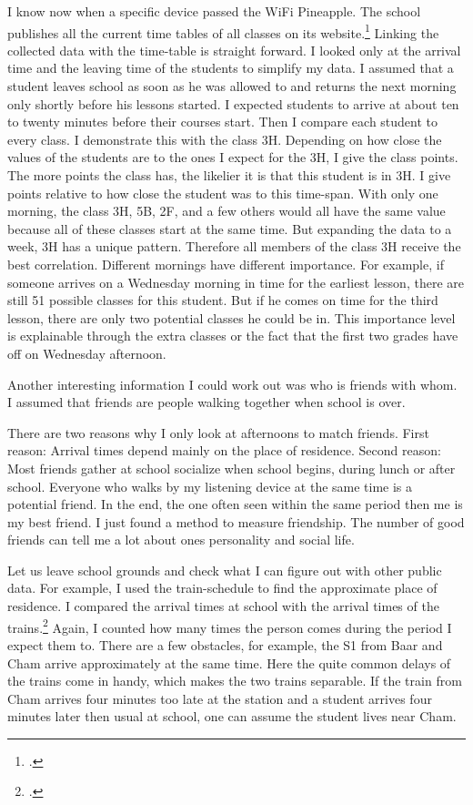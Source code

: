 \documentclass[paper=a4, fontsize=11pt]{article}
\begin{document}
I know now when a specific device passed the WiFi Pineapple. The school publishes all the current time tables of all classes on its website.\footcite{stundenplan}
Linking the collected data with the time-table is straight forward. I looked only at the arrival time and the leaving time of the students to simplify my data. I assumed that a student leaves school as soon as he was allowed to and returns the next morning only shortly before his lessons started. I expected students to arrive at about ten to twenty minutes before their courses start. Then I compare each student to every class. I demonstrate this with the class 3H. Depending on how close the values of the students are to the ones I expect for the 3H, I give the class points. The more points the class has, the likelier it is that this student is in 3H. I give points relative to how close the student was to this time-span. With only one morning, the class 3H, 5B, 2F, and a few others would all have the same value because all of these classes start at the same time. But expanding the data to a week, 3H has a unique pattern. Therefore all members of the class 3H receive the best correlation. Different mornings have different importance. For example, if someone arrives on a Wednesday morning in time for the earliest lesson, there are still 51 possible classes for this student. But if he comes on time for the third lesson, there are only two potential classes he could be in. This importance level is explainable through the extra classes or the fact that the first two grades have off on Wednesday afternoon. 

Another interesting information I could work out was who is friends with whom. I assumed that friends are people walking together when school is over.

There are two reasons why I only look at afternoons to match friends. First reason: Arrival times depend mainly on the place of residence. Second reason: Most friends gather at school socialize when school begins, during lunch or after school.
Everyone who walks by my listening device at the same time is a potential friend. In the end, the one often seen within the same period then me is my best friend. I just found a method to measure friendship. The number of good friends can tell me a lot about ones personality and social life.

Let us leave school grounds and check what I can figure out with other public data. For example, I used the train-schedule to find the approximate place of residence. I compared the arrival times at school with the arrival times of the trains.\footcite{sbbonlinefahrplan} Again, I counted how many times the person comes during the period I expect them to. There are a few obstacles, for example, the S1 from Baar and Cham arrive approximately at the same time. Here the quite common delays of the trains come in handy, which makes the two trains separable. If the train from Cham arrives four minutes too late at the station and a student arrives four minutes later then usual at school, one can assume the student lives near Cham.
\end{document}
